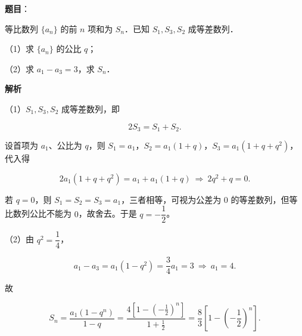 \begin{answer}

\textbf{题目}：

等比数列 $\{a_n\}$ 的前 $n$ 项和为 $S_n$．已知 $S_1,S_3,S_2$ 成等差数列．

（1）求 $\{a_n\}$ 的公比 $q$；

（2）求 $a_1-a_3=3$，求 $S_n$．

\textbf{解析}

（1）$S_1,S_3,S_2$ 成等差数列，即

\nopagebreak[4]
\[2S_3=S_1+S_2 .\]

设首项为 $a_1$、公比为 $q$，则 $S_1=a_1$，$S_2=a_1(1+q)$，$S_3=a_1(1+q+q^2)$，代入得

\nopagebreak[4]
\[2a_1(1+q+q^2)=a_1+a_1(1+q)\ \Longrightarrow\ 2q^2+q=0 .\]

若 $q=0$，则 $S_1=S_2=S_3=a_1$，三者相等，可视为公差为 $0$ 的等差数列，但等比数列公比不能为 $0$，故舍去。于是 $q=-\dfrac12$。

（2）由 $q^2=\dfrac14$，

\nopagebreak[4]
\[a_1-a_3=a_1(1-q^2)=\frac34a_1=3\ \Longrightarrow\ a_1=4 .\]

故

\nopagebreak[4]
\[S_n=\frac{a_1(1-q^n)}{1-q}
=\frac{4\left[1-\left(-\frac12\right)^n\right]}{1+\frac12}
=\frac83\left[1-\left(-\frac12\right)^n\right].\]


\end{answer}
